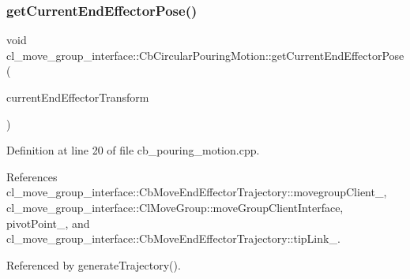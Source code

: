 \subsubsection{\texorpdfstring{get\+Current\+End\+Effector\+Pose()}{getCurrentEndEffectorPose()}}
{\footnotesize\ttfamily void cl\+\_\+move\+\_\+group\+\_\+interface\+::\+Cb\+Circular\+Pouring\+Motion\+::get\+Current\+End\+Effector\+Pose (\begin{DoxyParamCaption}\item[{tf\+::\+Stamped\+Transform \&}]{current\+End\+Effector\+Transform }\end{DoxyParamCaption})}



Definition at line 20 of file cb\+\_\+pouring\+\_\+motion.\+cpp.



References cl\+\_\+move\+\_\+group\+\_\+interface\+::\+Cb\+Move\+End\+Effector\+Trajectory\+::movegroup\+Client\+\_\+, cl\+\_\+move\+\_\+group\+\_\+interface\+::\+Cl\+Move\+Group\+::move\+Group\+Client\+Interface, pivot\+Point\+\_\+, and cl\+\_\+move\+\_\+group\+\_\+interface\+::\+Cb\+Move\+End\+Effector\+Trajectory\+::tip\+Link\+\_\+.



Referenced by generate\+Trajectory().


